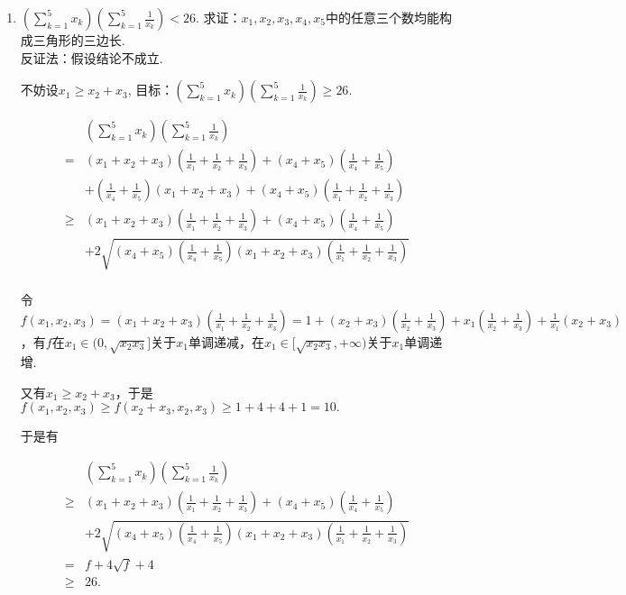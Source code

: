 \documentclass[8pt]{article}
\begin{document}
\begin{enumerate}
		~\\

		\item $\displaystyle \left(\sum_{k=1}^{5} x_k\right)\left(\sum_{k=1}^{5}\frac{1}{x_k}\right)<26$. 求证：$x_1, x_2, x_3, x_4, x_5$中的任意三个数均能构成三角形的三边长.
			~\\

			反证法：假设结论不成立.

			不妨设$x_1\geq x_2+x_3$, 目标：$\displaystyle \left(\sum_{k=1}^{5}{x_k}\right)\left(\sum_{k=1}^{5}{\frac{1}{x_k}}\right)\geq 26.$

			$$
			\begin{array}{cl}
			&\displaystyle \left(\sum_{k=1}^{5}{x_k}\right)\left(\sum_{k=1}^{5}{\frac{1}{x_k}}\right)\\
			=&\displaystyle (x_1+x_2+x_3)\left(\frac{1}{x_1}+\frac{1}{x_2}+\frac{1}{x_3}\right)+(x_4+x_5)\left(\frac{1}{x_4}+\frac{1}{x_5}\right)\\
			&\displaystyle +\left(\frac{1}{x_4}+\frac{1}{x_5}\right)(x_1+x_2+x_3)+(x_4+x_5)\left(\frac{1}{x_1}+\frac{1}{x_2}+\frac{1}{x_3}\right)\\
			\geq&\displaystyle (x_1+x_2+x_3)\left(\frac{1}{x_1}+\frac{1}{x_2}+\frac{1}{x_3}\right)+(x_4+x_5)\left(\frac{1}{x_4}+\frac{1}{x_5}\right)\\
			&\displaystyle +2\sqrt{(x_4+x_5)\left(\frac{1}{x_4}+\frac{1}{x_5}\right)(x_1+x_2+x_3)\left(\frac{1}{x_1}+\frac{1}{x_2}+\frac{1}{x_3}\right)}\\
			\end{array}
			$$

			令$f(x_1, x_2, x_3)=(x_1+x_2+x_3)\displaystyle\left(\frac{1}{x_1}+\frac{1}{x_2}+\frac{1}{x_3}\right)=1+(x_2+x_3)\left(\frac{1}{x_2}+\frac{1}{x_3}\right)+x_1\left(\frac{1}{x_2}+\frac{1}{x_3}\right)+\frac{1}{x_1}(x_2+x_3)$，有$f$在$x_1\in(0, \sqrt{x_2 x_3}]$关于$x_1$单调递减，在$x_1\in[\sqrt{x_2 x_3}, +\infty)$关于$x_1$单调递增.

			又有$x_1\geq x_2+x_3$，于是$f(x_1, x_2, x_3)\geq f(x_2+x_3, x_2, x_3)\geq1+4+4+1=10.$

			于是有



			$$
			\begin{array}{cl}
			&\displaystyle \left(\sum_{k=1}^{5}{x_k}\right)\left(\sum_{k=1}^{5}{\frac{1}{x_k}}\right)\\
			\geq&(x_1+x_2+x_3)\left(\frac{1}{x_1}+\frac{1}{x_2}+\frac{1}{x_3}\right)+(x_4+x_5)\left(\frac{1}{x_4}+\frac{1}{x_5}\right)\\
			&\displaystyle +2\sqrt{(x_4+x_5)\left(\frac{1}{x_4}+\frac{1}{x_5}\right)(x_1+x_2+x_3)\left(\frac{1}{x_1}+\frac{1}{x_2}+\frac{1}{x_3}\right)}\\
			=&f+4\sqrt{f}+4\\
			\geq&26.
			\end{array}
			$$


\end{enumerate}
\end{document}

